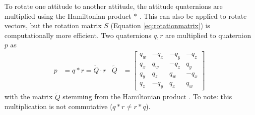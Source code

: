 To rotate one attitude to another attitude, the attitude quaternions are multiplied using the Hamiltonian product $*$ .
This can also be applied to rotate vectors, but the rotation matrix $S$ (Equation \ref{eq:rotationmatrix}) is computationally more efficient.
Two quaternions $q, r$ are multiplied to quaternion $p$ as \cite{stevens2015}
\begin{align}
    p &= q * r = \tilde Q \cdot r &
    \tilde Q &= \begin{bmatrix}
        q_w & -q_x & -q_y & -q_z \\
        q_x & q_w & -q_z & q_y \\
        q_y & q_z & q_w & -q_x \\
        q_z & -q_y & q_x & q_w
    \end{bmatrix} 
    \label{eq:quaternion-mult}
\end{align}
with the matrix $\tilde Q$ stemming from the Hamiltonian product \cite{stevens2015}.
To note: this multiplication is not commutative ($q*r \neq r*q$).

